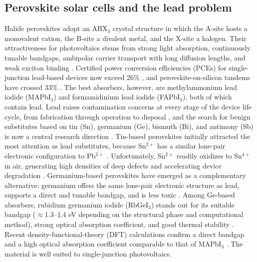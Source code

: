 \documentclass[review]{elsarticle}
\begin{document}
\subsection{Perovskite solar cells and the lead problem}
Halide perovskites adopt an ABX$_{3}$ crystal structure in which the A-site hosts a monovalent cation, the B-site a divalent metal, and the X-site a halogen. Their attractiveness for photovoltaics stems from strong light absorption, continuously tunable bandgaps, ambipolar carrier transport with long diffusion lengths, and weak exciton binding \cite{r7,r8}. Certified power conversion efficiencies (PCEs) for single-junction lead-based devices now exceed 26\% \cite{r3}, and perovskite-on-silicon tandems have crossed 33\% \cite{r3}. The best absorbers, however, are methylammonium lead iodide (MAPbI$_{3}$) and formamidinium lead iodide (FAPbI$_{3}$), both of which contain lead. Lead raises contamination concerns at every stage of the device life cycle, from fabrication through operation to disposal \cite{r9,r10}, and the search for benign substitutes based on tin (Sn), germanium (Ge), bismuth (Bi), and antimony (Sb) is now a central research direction \cite{r11,r12}.
Tin-based perovskites initially attracted the most attention as lead substitutes, because Sn$^{2+}$ has a similar lone-pair electronic configuration to Pb$^{2+}$ \cite{r11}. Unfortunately, Sn$^{2+}$ readily oxidizes to Sn$^{4+}$ in air, generating high densities of deep defects and accelerating device degradation \cite{r11,r12}. Germanium-based perovskites have emerged as a complementary alternative: germanium offers the same lone-pair electronic structure as lead, supports a direct and tunable bandgap, and is less toxic \cite{r13}. Among Ge-based absorbers, rubidium germanium iodide (RbGeI$_{3}$) stands out for its suitable bandgap ($\approx$1.3--1.4 eV depending on the structural phase and computational method), strong optical absorption coefficient, and good thermal stability \cite{r14,r15,r16}. Recent density-functional-theory (DFT) calculations confirm a direct bandgap and a high optical absorption coefficient comparable to that of MAPbI$_{3}$ \cite{r13,r17,r18}. The material is well suited to single-junction photovoltaics.
\end{document}
